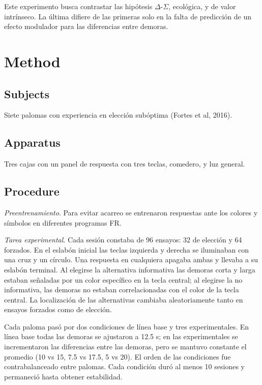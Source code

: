 \documentclass[a4paper,12pt]{article}
\begin{document}
Este experimento busca contrastar las hipótesis $\Delta$-$\Sigma$, ecológica, y de valor intrínseco.
La última difiere de las primeras solo en la falta de predicción de un efecto modulador para las diferencias entre demoras.

\section{Method}

\subsection{Subjects}

Siete palomas con experiencia en elección subóptima (Fortes et al, 2016).

\subsection{Apparatus}

Tres cajas con un panel de respuesta con tres teclas, comedero, y luz general.

\subsection{Procedure}

{\itshape Preentrenamiento}. Para evitar acarreo se entrenaron respuestas ante los colores y símbolos en diferentes programas FR.

{\itshape Tarea experimental}. Cada sesión constaba de 96 ensayos: 32 de elección y 64 forzados.
En el eslabón inicial las teclas izquierda y derecha se iluminaban con una cruz y un círculo.
Una respuesta en cualquiera apagaba ambas y llevaba a su eslabón terminal.
Al elegirse la alternativa informativa las demoras corta y larga estaban señaladas por un color específico en la tecla central; al elegirse la no informativa, las demoras no estaban correlacionadas con el color de la tecla central.
La localización de las alternativas cambiaba aleatoriamente tanto en ensayos forzados como de elección.

Cada paloma pasó por dos condiciones de línea base y tres experimentales.
En línea base todas las demoras se ajustaron a 12.5 s; en las experimentales se incrementaron las diferencias entre las demoras, pero se mantuvo constante el promedio (10 vs 15, 7.5 vs 17.5, 5 vs 20).
El orden de las condiciones fue contrabalanceado entre palomas.
Cada condición duró al menos 10 sesiones y permaneció hasta obtener estabilidad.
\end{document}
